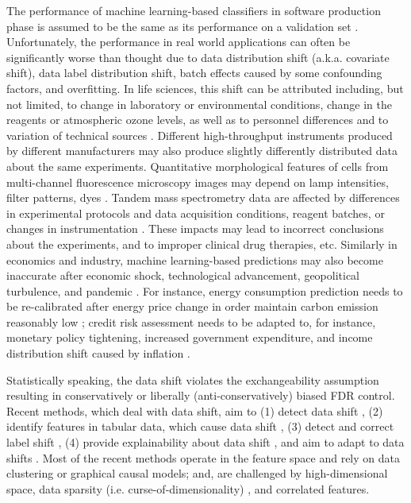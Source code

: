 \documentclass{article}
\begin{document}
The performance of machine learning-based classifiers in software production phase is assumed to be the same as its performance on a validation set  \cite{dmlsbook2022}. Unfortunately, the  performance in real world applications can often be significantly worse than thought due to data distribution shift (a.k.a. covariate shift), data label distribution shift, batch effects \cite{Candela2009DatasetShift} caused by some confounding factors, and overfitting. In life sciences, this shift can be attributed including, but not limited, to change in laboratory or environmental conditions, change in the reagents or atmospheric ozone levels, as well as to personnel differences and to variation of technical sources \cite{leek2010tackling}. Different high-throughput instruments produced by different manufacturers may also produce slightly differently distributed data about the same experiments. Quantitative morphological features of cells from multi-channel fluorescence microscopy images may depend on lamp intensities, filter patterns, dyes \cite{bray2016cell}. Tandem mass spectrometry data are affected by differences in experimental protocols and data acquisition conditions, reagent batches, or changes in instrumentation \cite{phua2022perspectives, vcuklina2021diagnostics}. These impacts may lead to incorrect conclusions about the experiments, and to improper clinical drug therapies, etc. Similarly in economics and industry, machine learning-based predictions may also become inaccurate after economic shock, technological advancement, geopolitical turbulence, and pandemic \cite{ramey2016macroeconomic}. For instance, energy consumption prediction needs to be re-calibrated after energy price change in order maintain carbon emission reasonably low \cite{clement2023coping}; credit risk assessment needs to be adapted to, for instance, monetary policy tightening, increased government expenditure, and income distribution shift caused by inflation \cite{kritzman2012regime,guo2023predict, Zhang:EECS-2021-262}.



Statistically speaking, the data shift violates the exchangeability assumption resulting in conservatively or liberally (anti-conservatively) biased FDR control. 
Recent methods, which deal with data shift, aim to (1) detect data shift  \cite{ dasu2009change}, (2) identify features in tabular data, which cause data shift \cite{kulinski2020feature}, (3) detect and correct label shift \cite{lipton2018detecting}, (4) provide explainability about data shift \cite{budhathoki2021did,kulinski2023towards}, and aim to adapt to data shifts \cite{sui2024unleashing, zhang2021adaptive, zhang2022memo}. Most of the recent methods operate in the feature space and rely on data clustering or graphical causal models; and, are challenged by high-dimensional space, data sparsity (i.e. curse-of-dimensionality) \cite{donoho2000high}, and correlated features. 
\end{document}
